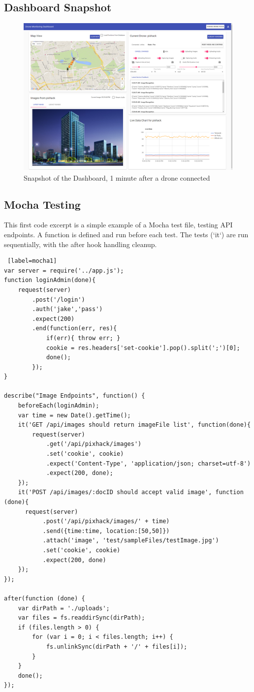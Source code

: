 \documentclass{article}
\begin{document}
\subsection{Dashboard Snapshot}\label{DashboardSnapshots}
\begin{figure}[h]
\centering
\caption{Snapshot of the Dashboard, 1 minute after a drone connected}
\includegraphics[width=\linewidth]{Dashboard}
\end{figure}



\subsection{Mocha Testing}
This first code excerpt is a simple example of a Mocha test file, testing API endpoints. A function is defined and run before each test. The tests (`it`) are run sequentially, with the after hook handling cleanup.
\begin{lstlisting} [label=mocha1]
var server = require('../app.js');
function loginAdmin(done){
	request(server)
		.post('/login')
		.auth('jake','pass')
		.expect(200)
		.end(function(err, res){
			if(err){ throw err; }
			cookie = res.headers['set-cookie'].pop().split(';')[0];
			done();
		});
}

describe("Image Endpoints", function() {
	beforeEach(loginAdmin); 	
	var time = new Date().getTime();
	it('GET /api/images should return imageFile list', function(done){
		request(server)
			.get('/api/pixhack/images')
			.set('cookie', cookie)
			.expect('Content-Type', 'application/json; charset=utf-8')
			.expect(200, done);
	});
	it('POST /api/images/:docID should accept valid image', function (done){
	  request(server)
		   .post('/api/pixhack/images/' + time)
		   .send({time:time, location:[50,50]})
		   .attach('image', 'test/sampleFiles/testImage.jpg')
		   .set('cookie', cookie)
		   .expect(200, done)
	});
});

after(function (done) {
	var dirPath = './uploads';
	var files = fs.readdirSync(dirPath);
	if (files.length > 0) {
		for (var i = 0; i < files.length; i++) {
			fs.unlinkSync(dirPath + '/' + files[i]);
		}
	}
	done();
});
\end{lstlisting}
\end{document}
